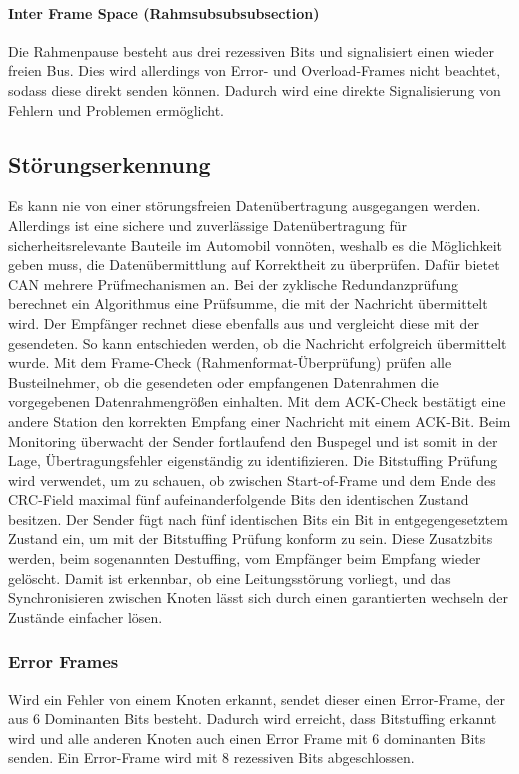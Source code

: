             \paragraph{Inter Frame Space (Rahmsubsubsubsection)}
            Die Rahmenpause besteht aus drei rezessiven Bits und signalisiert einen wieder freien Bus.
            Dies wird allerdings von Error- und Overload-Frames nicht beachtet, sodass diese direkt senden können.
            Dadurch wird eine direkte Signalisierung von Fehlern und Problemen ermöglicht.

    \subsection{Störungserkennung}
    Es kann nie von einer störungsfreien Datenübertragung ausgegangen werden.
    Allerdings ist eine sichere und zuverlässige Datenübertragung für sicherheitsrelevante Bauteile im Automobil vonnöten, weshalb es die Möglichkeit geben muss, die Datenübermittlung auf Korrektheit zu überprüfen.
    Dafür bietet CAN mehrere Prüfmechanismen an.
    Bei der zyklische Redundanzprüfung berechnet ein Algorithmus eine Prüfsumme, die mit der Nachricht übermittelt wird.
    Der Empfänger rechnet diese ebenfalls aus und vergleicht diese mit der gesendeten.
    So kann entschieden werden, ob die Nachricht erfolgreich übermittelt wurde.
    Mit dem Frame-Check (Rahmenformat-Überprüfung) prüfen alle Busteilnehmer, ob die gesendeten oder empfangenen Datenrahmen die vorgegebenen Datenrahmengrößen einhalten.
    Mit dem ACK-Check bestätigt eine andere Station den korrekten Empfang einer Nachricht mit einem ACK-Bit.
    Beim Monitoring überwacht der Sender fortlaufend den Buspegel und ist somit in der Lage, Übertragungsfehler eigenständig zu identifizieren.
    Die Bitstuffing Prüfung wird verwendet, um zu schauen, ob zwischen Start-of-Frame und dem Ende des CRC-Field maximal fünf aufeinanderfolgende Bits den identischen Zustand besitzen.
    Der Sender fügt nach fünf identischen Bits ein Bit in entgegengesetztem Zustand ein, um mit der Bitstuffing Prüfung konform zu sein.
    Diese Zusatzbits werden, beim sogenannten Destuffing, vom Empfänger beim Empfang wieder gelöscht. 
    Damit ist erkennbar, ob eine Leitungsstörung vorliegt, und das Synchronisieren zwischen Knoten lässt sich durch einen garantierten wechseln der Zustände einfacher lösen. 

        \subsubsection{Error Frames}
        Wird ein Fehler von einem Knoten erkannt, sendet dieser einen Error-Frame, der aus 6 Dominanten Bits besteht.
        Dadurch wird erreicht, dass Bitstuffing erkannt wird und alle anderen Knoten auch einen Error Frame mit 6 dominanten Bits senden.
        Ein Error-Frame wird mit 8 rezessiven Bits abgeschlossen.

